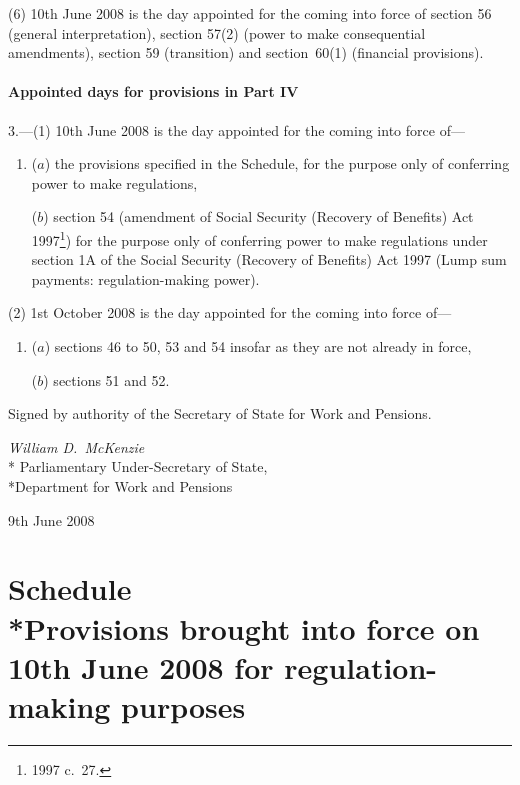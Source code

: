 \documentclass[12pt,a4paper]{article}
\begin{document}
(6) 10th June 2008 is the day appointed for the coming into force of section 56 (general interpretation), section 57(2) (power to make consequential amendments), section 59 (transition) and section~60(1) (financial provisions).

\subsection[3. Appointed days for provisions in Part IV]{Appointed days for provisions in Part IV}

3.---(1)  10th June 2008 is the day appointed for the coming into force of—
\begin{enumerate}\item[]
($a$) the provisions specified in the Schedule, for the purpose only of conferring power to make regulations,

($b$) section 54 (amendment of Social Security (Recovery of Benefits) Act 1997\footnote{1997 c.~27.}) for the purpose only of conferring power to make regulations under section 1A of the Social Security (Recovery of Benefits) Act 1997 (Lump sum payments: regulation-making power).
\end{enumerate}

(2) 1st October 2008 is the day appointed for the coming into force of—
\begin{enumerate}\item[]
($a$) sections 46 to 50, 53 and 54 insofar as they are not already in force,

($b$) sections 51 and 52.
\end{enumerate}

\bigskip

Signed 
by authority of the 
Secretary of State for Work and Pensions.

{\raggedleft
\emph{William D.\ McKenzie}\\*
Parliamentary Under-Secretary 
of State,\\*Department for Work and Pensions

}

9th June 2008

\small

\part[Schedule --- Provisions brought into force on 10th June 2008 for regulation-making purposes]{Schedule\\*Provisions brought into force on 10th June 2008 for regulation-making purposes}
\end{document}
